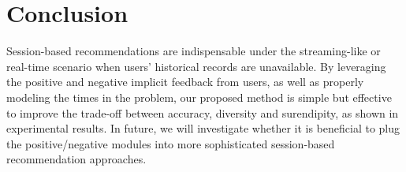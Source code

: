 \section{Conclusion}

Session-based recommendations are indispensable under the streaming-like 
or real-time scenario when users' historical records are unavailable. 
By leveraging the positive and negative implicit feedback from users, as well
as properly modeling the times in the problem, 
our proposed method is simple but effective to improve the 
trade-off between accuracy, diversity and surendipity, 
as shown in experimental results. In future, we will investigate whether it is 
beneficial to plug the positive/negative modules into more sophisticated 
session-based recommendation approaches.
